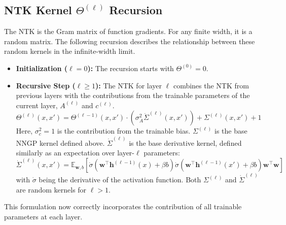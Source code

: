 \documentclass[a4paper]{article}
\begin{document}
\subsection{NTK Kernel \(\Theta^{(\ell)}\) Recursion}
The NTK is the Gram matrix of function gradients. For any finite width, it is a random matrix. The following recursion describes the relationship between these random kernels in the infinite-width limit.
\begin{itemize}
    \item \textbf{Initialization (\(\ell=0\)):} The recursion starts with $\Theta^{(0)} = 0$.
    
    \item \textbf{Recursive Step (\(\ell \ge 1\)):} The NTK for layer $\ell$ combines the NTK from previous layers with the contributions from the trainable parameters of the current layer, $A^{(\ell)}$ and $c^{(\ell)}$.
    \begin{equation}
        \boxed{
        \Theta^{(\ell)}(x, x') = \Theta^{(\ell-1)}(x, x') \cdot \left(\sigma_A^2\dot{\Sigma}^{(\ell)}(x, x')\right) + \Sigma^{(\ell)}(x, x') + 1
        }
    \end{equation}
    Here, $\sigma_c^2=1$ is the contribution from the trainable bias. $\Sigma^{(\ell)}$ is the base NNGP kernel defined above. $\dot{\Sigma}^{(\ell)}$ is the base derivative kernel, defined similarly as an expectation over layer-$\ell$ parameters:
    \begin{equation}
        \dot{\Sigma}^{(\ell)}(x, x') = \mathbb{E}_{\bm{w}, b} \left[ \dot{\sigma}\left(\bm{w}^\top \bm{h}^{(\ell-1)}(x) + \beta b\right) \dot{\sigma}\left(\bm{w}^\top \bm{h}^{(\ell-1)}(x') + \beta b\right) \bm{w}^\top\bm{w} \right]
    \end{equation}
    with $\dot{\sigma}$ being the derivative of the activation function. Both $\Sigma^{(\ell)}$ and $\dot{\Sigma}^{(\ell)}$ are random kernels for $\ell > 1$.
\end{itemize}
This formulation now correctly incorporates the contribution of all trainable parameters at each layer.
\end{document}
